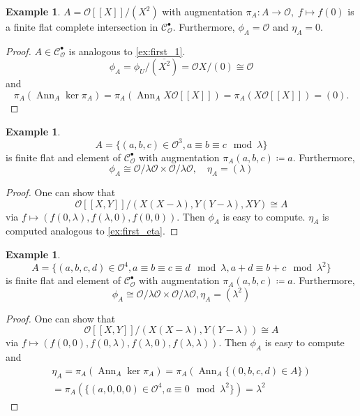 \documentclass{article}
\theoremstyle{plain}%
\theoremstyle{definition}
\newtheorem{example}[theorem]{Example}
\theoremstyle{remark}
\newcommand{\cob}{\mathcal{C}_\mathcal{O}^\bullet}
\newcommand{\ann}{\operatorname{Ann}}
\begin{document}
\begin{example}\label{ex:ddt3}\cite[cf.][example 3]{Darmon1995}
    \(A = \mathcal{O}[[X]]/(X^2)\) with augmentation \(\pi_A\colon A \to \mathcal{O},\; f \mapsto f(0)\) 
    is a finite flat complete intersection in \(\cob\).
    Furthermore, \(\phi_A = \mathcal{O}\) and \(\eta_A = 0\).
\end{example}
\begin{proof}
    \(A \in \cob\) is analogous to \cref{ex:first_1}. 
    \[
        \phi_A = \phi_U/(\overline{X^2}) = \mathcal{O}X/(0) \cong \mathcal{O}
    \] 
    and
    \[
        \pi_A(\ann_A \ker \pi_A) = \pi_A(\ann_A X \mathcal{O}[[X]]) = \pi_A(X \mathcal{O}[[X]]) = (0).  
    \]
\end{proof}

\begin{example}\label{ex:ddt2}\cite[section 5.1, example 2]{Darmon1995}
    \[
        A = \{(a, b, c) \in \mathcal{O}^3, a \equiv b \equiv c \mod \lambda\}
    \]
    is finite flat and element of \(\cob\) with augmentation \(\pi_A(a, b, c) \coloneqq a\).
    Furthermore, 
    \[
        \phi_A \cong \mathcal{O}/\lambda \mathcal{O} \times \mathcal{O}/\lambda \mathcal{O},\quad \eta_A = (\lambda)
    \]
\end{example}
\begin{proof}
    One can show that 
    \[
       \mathcal{O}[[X, Y ]]/(X(X - \lambda), Y (Y - \lambda), XY) \cong A
    \]
    via \(f \mapsto (f(0,\lambda), f(\lambda, 0), f(0,0))\).
    Then \(\phi_A\) is easy to compute. \(\eta_A\) is computed analogous to \cref{ex:first_eta}.
\end{proof}

\begin{example}\label{ex:ddt4}\cite[section 5.1, example 4]{Darmon1995}
    \[
        A = \{(a, b, c, d) \in \mathcal{O}^4, a \equiv b \equiv c \equiv d \mod \lambda, 
        a + d \equiv b + c \mod \lambda^2\}
    \]
    is finite flat and element of \(\cob\) with augmentation \(\pi_A(a, b, c) \coloneqq a\).
    Furthermore,
    \[
        \phi_A \cong \mathcal{O}/\lambda \mathcal{O} \times \mathcal{O}/\lambda \mathcal{O}, \eta_A = (\lambda^2)
    \]
\end{example}
\begin{proof}
    One can show that 
    \[
        \mathcal{O}[[X, Y]]/(X(X - \lambda), Y (Y - \lambda)) \cong A
    \]
    via \(f \mapsto (f(0,0), f(0, \lambda), f(\lambda, 0), f(\lambda, \lambda))\).
    Then \(\phi_A\) is easy to compute and
    \begin{multline*}
        \eta_A = \pi_A(\ann_A\ker\pi_A) = \pi_A(\ann_A \{(0,b,c,d) \in A\}) \\
        = \pi_A(\{(a,0,0,0) \in \mathcal{O}^4, a \equiv 0 \mod \lambda^2\}) = \lambda^2
    \end{multline*}
\end{proof}
\end{document}
